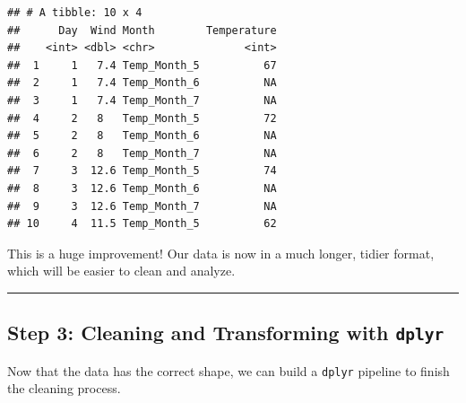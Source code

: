 \documentclass[
  11pt,
]{article}
\begin{document}
\begin{verbatim}
## # A tibble: 10 x 4
##      Day  Wind Month        Temperature
##    <int> <dbl> <chr>              <int>
##  1     1   7.4 Temp_Month_5          67
##  2     1   7.4 Temp_Month_6          NA
##  3     1   7.4 Temp_Month_7          NA
##  4     2   8   Temp_Month_5          72
##  5     2   8   Temp_Month_6          NA
##  6     2   8   Temp_Month_7          NA
##  7     3  12.6 Temp_Month_5          74
##  8     3  12.6 Temp_Month_6          NA
##  9     3  12.6 Temp_Month_7          NA
## 10     4  11.5 Temp_Month_5          62
\end{verbatim}

This is a huge improvement! Our data is now in a much longer, tidier
format, which will be easier to clean and analyze.

\begin{center}\rule{0.5\linewidth}{0.5pt}\end{center}

\subsection{\texorpdfstring{Step 3: Cleaning and Transforming with
\texttt{dplyr}}{Step 3: Cleaning and Transforming with dplyr}}\label{step-3-cleaning-and-transforming-with-dplyr}

Now that the data has the correct shape, we can build a \texttt{dplyr}
pipeline to finish the cleaning process.
\end{document}
